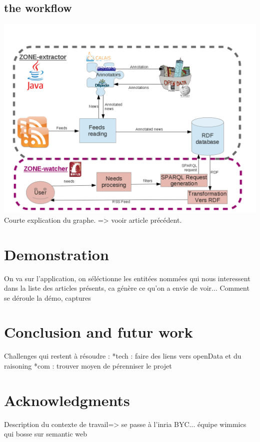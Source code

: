 \documentclass{llncs}
\begin{document}
\subsection{the workflow}
%
 \includegraphics[scale=0.5]{diagramArchi.png}
 Courte explication du graphe.
 => vooir article précédent.
%
%

\section{Demonstration}
%
On va sur l'application, on séléctionne les entitées nommées qui nous interessent dans la liste des articles présents, ca génère ce qu'on a envie de voir...
Comment se déroule la démo, captures
%

\section{Conclusion and futur work}
%
Challenges qui restent à résoudre :
	*tech : faire des liens vers openData et du raisoning
	*com : trouver moyen de pérenniser le projet
%

\section{Acknowledgments}
%
Description du contexte de travail=> se passe à l'inria BYC... équipe wimmics qui bosse sur semantic web

%
\end{document}
